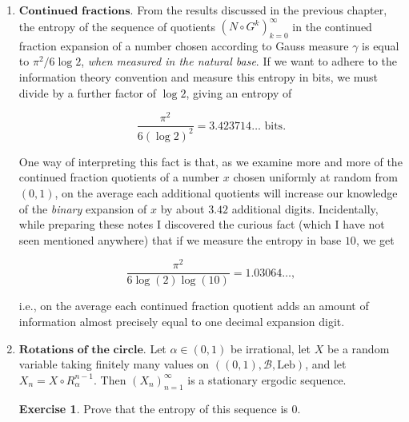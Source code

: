 \documentclass[11pt]{report}
\theoremstyle{plain}
\theoremstyle{definition}
\newtheorem{xexercise}[thm]{Exercise}
\begin{document}
\begin{enumerate}[label=\arabic*.]
\item $\textbf{Continued fractions.}$ From the results
discussed in the previous chapter, the entropy of the
sequence of quotients $(N\circ G^k)_{k=0}^\infty$ in
the continued fraction expansion of a number chosen
according to Gauss measure $\gamma$ is equal to
$\pi^2/6\log 2$, \emph{when measured in the natural base}.
If we want to adhere to the information theory
convention and measure this entropy in bits, we must
divide by a further factor of $\log 2$, giving an
entropy of

\[
\frac{\pi^2}{6(\log 2)^2} = 3.423714\ldots \textrm{ bits}.
\]

\noindent One way of interpreting this fact is that, as we
examine more and more of the continued fraction
quotients of a number $x$ chosen uniformly at random
from $(0,1)$, on the average each additional
quotients will increase our knowledge of the \emph{binary}
expansion of $x$ by about $3.42$ additional digits.
Incidentally, while preparing these notes I discovered
the curious fact (which I have not seen mentioned
anywhere) that if we measure the entropy in base $10$,
we get

\[
\frac{\pi^2}{6\log(2)\log(10)} = 1.03064\ldots,
\]

\noindent i.e., on the average each continued fraction quotient
adds an amount of information almost precisely equal
to one decimal expansion digit.

\item $\textbf{Rotations of the circle.}$ Let
$\alpha\in(0,1)$ be irrational, let $X$ be a random
variable taking finitely many values on
$((0,1), \mathcal{B}, \textrm{Leb})$, and let
$X_n = X\circ R_\alpha^{n-1}$. Then
$(X_n)_{n=1}^\infty$ is a stationary ergodic
sequence.

\begin{xexercise}
Prove that the entropy of this sequence is $0$.
\end{xexercise}
\end{enumerate}
\end{document}

